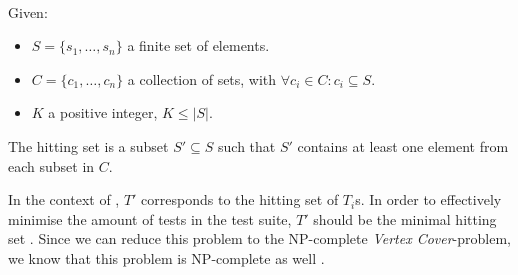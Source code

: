 \clearpage

\begin{definition}
\label{def:hitting-set}
\mbox{}\\Given:
\begin{itemize}
	\item $S = \{s_1, \dots, s_n\}$ a finite set of elements.
	\item $C = \{c_1, \dots, c_n\}$ a collection of sets, with $\forall c_i \in C : c_i \subseteq S$.
	\item $K$ a positive integer, $K \le |S|$.
\end{itemize}

\noindent The hitting set is a subset $S' \subseteq S$ such that $S'$ contains at least one element from each subset in $C$.
\end{definition}

\noindent In the context of \tsm{}, $T'$ corresponds to the hitting set of $T_i$s. In order to effectively minimise the amount of tests in the test suite, $T'$ should be the minimal hitting set \cite{10.1002/stv.430}. Since we can reduce this problem to the NP-complete \emph{Vertex Cover}-problem, we know that this problem is NP-complete as well \cite{10.5555/574848}.
